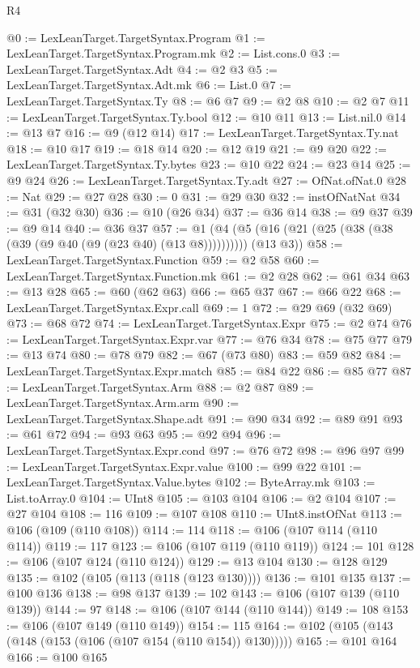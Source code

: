 \begin{lexlean}{R4}
\begin{coremodule}
{{{{{{{{{{{{{{{{{{{{{{{{{{{{{{{{{{{{{{{{{{{{{{{{{{{{{{{{{{{{{{{{{{{{{{{{{{{{{{{{{{{{{{{{{{{{@0 := LexLeanTarget.TargetSyntax.Program
@1 := LexLeanTarget.TargetSyntax.Program.mk
@2 := List.cons.{0}
@3 := LexLeanTarget.TargetSyntax.Adt
@4 := @2 @3
@5 := LexLeanTarget.TargetSyntax.Adt.mk
@6 := List.{0}
@7 := LexLeanTarget.TargetSyntax.Ty
@8 := @6 @7
@9 := @2 @8
@10 := @2 @7
@11 := LexLeanTarget.TargetSyntax.Ty.bool
@12 := @10 @11
@13 := List.nil.{0}
@14 := @13 @7
@16 := @9 (@12 @14)
@17 := LexLeanTarget.TargetSyntax.Ty.nat
@18 := @10 @17
@19 := @18 @14
@20 := @12 @19
@21 := @9 @20
@22 := LexLeanTarget.TargetSyntax.Ty.bytes
@23 := @10 @22
@24 := @23 @14
@25 := @9 @24
@26 := LexLeanTarget.TargetSyntax.Ty.adt
@27 := OfNat.ofNat.{0}
@28 := Nat
@29 := @27 @28
@30 := 0
@31 := @29 @30
@32 := instOfNatNat
@34 := @31 (@32 @30)
@36 := @10 (@26 @34)
@37 := @36 @14
@38 := @9 @37
@39 := @9 @14
@40 := @36 @37
@57 := @1 (@4 (@5 (@16 (@21 (@25 (@38 (@38 (@39 (@9 @40 (@9 (@23 @40) (@13 @8)))))))))) (@13 @3))
@58 := LexLeanTarget.TargetSyntax.Function
@59 := @2 @58
@60 := LexLeanTarget.TargetSyntax.Function.mk
@61 := @2 @28
@62 := @61 @34
@63 := @13 @28
@65 := @60 (@62 @63)
@66 := @65 @37
@67 := @66 @22
@68 := LexLeanTarget.TargetSyntax.Expr.call
@69 := 1
@72 := @29 @69 (@32 @69)
@73 := @68 @72
@74 := LexLeanTarget.TargetSyntax.Expr
@75 := @2 @74
@76 := LexLeanTarget.TargetSyntax.Expr.var
@77 := @76 @34
@78 := @75 @77
@79 := @13 @74
@80 := @78 @79
@82 := @67 (@73 @80)
@83 := @59 @82
@84 := LexLeanTarget.TargetSyntax.Expr.match
@85 := @84 @22
@86 := @85 @77
@87 := LexLeanTarget.TargetSyntax.Arm
@88 := @2 @87
@89 := LexLeanTarget.TargetSyntax.Arm.arm
@90 := LexLeanTarget.TargetSyntax.Shape.adt
@91 := @90 @34
@92 := @89 @91
@93 := @61 @72
@94 := @93 @63
@95 := @92 @94
@96 := LexLeanTarget.TargetSyntax.Expr.cond
@97 := @76 @72
@98 := @96 @97
@99 := LexLeanTarget.TargetSyntax.Expr.value
@100 := @99 @22
@101 := LexLeanTarget.TargetSyntax.Value.bytes
@102 := ByteArray.mk
@103 := List.toArray.{0}
@104 := UInt8
@105 := @103 @104
@106 := @2 @104
@107 := @27 @104
@108 := 116
@109 := @107 @108
@110 := UInt8.instOfNat
@113 := @106 (@109 (@110 @108))
@114 := 114
@118 := @106 (@107 @114 (@110 @114))
@119 := 117
@123 := @106 (@107 @119 (@110 @119))
@124 := 101
@128 := @106 (@107 @124 (@110 @124))
@129 := @13 @104
@130 := @128 @129
@135 := @102 (@105 (@113 (@118 (@123 @130))))
@136 := @101 @135
@137 := @100 @136
@138 := @98 @137
@139 := 102
@143 := @106 (@107 @139 (@110 @139))
@144 := 97
@148 := @106 (@107 @144 (@110 @144))
@149 := 108
@153 := @106 (@107 @149 (@110 @149))
@154 := 115
@164 := @102 (@105 (@143 (@148 (@153 (@106 (@107 @154 (@110 @154)) @130)))))
@165 := @101 @164
@166 := @100 @165
}}}}}}}}}}}}}}}}}}}}}}}}}}}}}}}}}}}}}}}}}}}}}}}}}}}}}}}}}}}}}}}}}}}}}}}}}}}}}}}}}}}}}}}}}}}}
\end{coremodule}
\end{lexlean}
